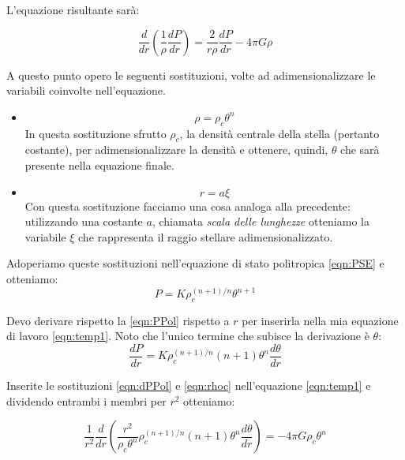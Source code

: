 \documentclass{article}
\begin{document}
L'equazione risultante sarà:

\begin{equation}\label{eqn:temp1}
 \frac{d}{dr}\left ( \frac{1}{\rho}\frac{dP}{dr} \right ) = \frac{2}{r\rho}\frac{dP}{dr} - 4\pi G \rho
\end{equation}

A questo punto opero le seguenti sostituzioni, volte ad adimensionalizzare le variabili coinvolte nell'equazione.

\begin{itemize}
\item
\begin{equation}\label{eqn:rhoc}
 \rho = \rho_c \theta^n
\end{equation}
In questa sostituzione sfrutto $\rho_c$, la densità centrale della stella (pertanto costante), per adimensionalizzare la densità e ottenere, quindi, $\theta$ che sarà presente nella equazione finale.
\item
\begin{equation}\label{eqn:rXi}
 r = a\xi
\end{equation}
Con questa sostituzione facciamo una cosa analoga alla precedente: utilizzando una costante $a$, chiamata \emph{scala delle lunghezze} otteniamo la variabile $\xi$ che rappresenta il raggio stellare adimensionalizzato.
\end{itemize}

Adoperiamo queste sostituzioni nell'equazione di stato politropica \ref{eqn:PSE} e otteniamo:
\begin{equation}\label{eqn:PPol}
 P=K\rho_c^{(n+1)/n}\theta^{n+1}
\end{equation}

Devo derivare rispetto la \ref{eqn:PPol} rispetto a $r$ per inserirla nella mia equazione di lavoro \ref{eqn:temp1}. Noto che l'unico termine che subisce la derivazione è $\theta$:
\begin{equation}\label{eqn:dPPol}
 \frac{dP}{dr} = K\rho_c^{(n+1)/n}\left ( n+1 \right ) \theta^n \frac{d\theta}{dr}
\end{equation}

Inserite le sostituzioni \ref{eqn:dPPol} e \ref{eqn:rhoc} nell'equazione \ref{eqn:temp1} e dividendo entrambi i membri per $r^2$ otteniamo:

\begin{equation*}
 \frac{1}{r^2}\frac{d}{dr}\left ( \frac{r^2}{\rho_c \theta^n} \rho_c^{(n+1)/n} \left ( n+1 \right )\theta^n \frac{d\theta}{dr} \right ) = -4\pi G \rho_c \theta^n
\end{equation*}
\end{document}
